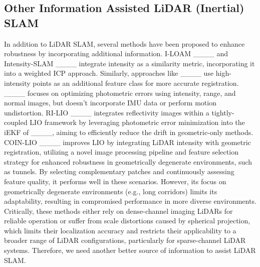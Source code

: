 
\vspace{-1mm}

\subsection{Other Information Assisted LiDAR (Inertial) SLAM}
\vspace{-1mm}
In addition to LiDAR SLAM, several methods have been proposed to enhance robustness by incorporating additional information. I-LOAM ____ and Intensity-SLAM ____ integrate intensity as a similarity metric, incorporating it into a weighted ICP approach. Similarly, approaches like ____ use high-intensity points as an additional feature class for more accurate registration. ____ focuses on optimizing photometric errors using intensity, range, and normal images, but doesn't incorporate IMU data or perform motion undistortion. RI-LIO ____ integrates reflectivity images within a tightly-coupled LIO framework by leveraging photometric error minimization into the iEKF of ____, aiming to efficiently reduce the drift in geometric-only methods. COIN-LIO ____ improves LIO by integrating LiDAR intensity with geometric registration, utilizing a novel image processing pipeline and feature selection strategy for enhanced robustness in geometrically degenerate environments, such as tunnels. By selecting complementary patches and continuously assessing feature quality, it performs well in these scenarios. However, its focus on geometrically degenerate environments (e.g., long corridors) limits its adaptability, resulting in compromised performance in more diverse environments. Critically, these methods either rely on dense-channel imaging LiDARs for reliable operation or suffer from scale distortions caused by spherical projection, which limits their localization accuracy and restricts their applicability to a broader range of LiDAR configurations, particularly for sparse-channel LiDAR systems. Therefore, we need another better source of information to assist LiDAR SLAM. 

